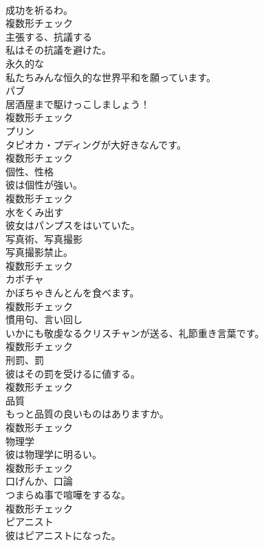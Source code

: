 \documentclass[8pt]{extreport}
\begin{document}
\begin{CJK}{UTF8}{min}
\\	成功を祈るわ。	
\\	複数形チェック
\\	[動詞]	主張する、抗議する	
\\	私はその抗議を避けた。	
\\	[形容詞]	永久的な	
\\	私たちみんな恒久的な世界平和を願っています。	
\\	[名詞]	パブ	
\\	居酒屋まで駆けっこしましょう！	
\\	複数形チェック
\\	[名詞]	プリン	
\\	タピオカ・プディングが大好きなんです。	
\\	複数形チェック
\\	[名詞]	個性、性格	
\\	彼は個性が強い。	
\\	複数形チェック
\\	[動詞]	水をくみ出す	
\\	彼女はパンプスをはいていた。	
\\	[名詞]	写真術、写真撮影	
\\	写真撮影禁止。	
\\	複数形チェック
\\	[名詞]	カボチャ	
\\	かぼちゃきんとんを食べます。	
\\	複数形チェック
\\	[名詞]	慣用句、言い回し	
\\	いかにも敬虔なるクリスチャンが送る、礼節重き言葉です。	
\\	複数形チェック
\\	[名詞]	刑罰、罰	
\\	彼はその罰を受けるに値する。	
\\	複数形チェック
\\	[名詞]	品質	
\\	もっと品質の良いものはありますか。	
\\	複数形チェック
\\	[名詞]	物理学	
\\	彼は物理学に明るい。	
\\	複数形チェック
\\	[名詞]	口げんか、口論	
\\	つまらぬ事で喧嘩をするな。	
\\	複数形チェック
\\	[名詞]	ピアニスト	
\\	彼はピアニストになった。	

\end{CJK}
\end{document}

